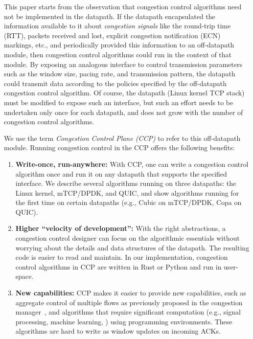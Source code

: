 This paper starts from the observation that congestion control algorithms need not be implemented in the datapath. 
If the datapath encapsulated the information available to it about {\em congestion signals} like the round-trip time (RTT), packets received and lost, explicit congestion notification (ECN) markings, etc., and periodically provided this information to an off-datapath module, then congestion control algorithms could run in the context of that module. 
By exposing an analogous interface to control transmission parameters such as the window size, pacing rate, and transmission pattern, the datapath could transmit data according to the policies specified by the off-datapath congestion control algorithm. Of course, the datapath (\eg Linux kernel TCP stack) must be modified to expose
such an interface, but such an effort needs to be undertaken only once for each datapath, and does not grow with the number of congestion control algorithms.

We use the term {\em Congestion Control Plane (CCP)} to refer to this off-datapath module. Running congestion control in the CCP offers the following benefits:
\begin{enumerate}
    \item {\bf Write-once, run-anywhere:} With CCP, one can write a congestion control algorithm once and run it on any datapath that supports the specified interface. 
    We describe several algorithms running on three datapaths: the Linux kernel, mTCP/DPDK, and QUIC, and show algorithms running for the first time on certain datapaths (e.g., Cubic on mTCP/DPDK, Copa on QUIC).
    \item {\bf Higher ``velocity of development'':} With the right abstractions,
      a congestion control designer can focus on the algorithmic essentials
      without worrying about the details and data structures of the
      datapath. The resulting code is easier to read and maintain. In our implementation, congestion control algorithms in CCP are written in Rust or Python and run in user-space. 

    \item {\bf New capabilities:} CCP makes it easier to provide new
      capabilities, such as aggregate control of multiple flows as previously
      proposed in the congestion manager~\cite{cm}, and algorithms that require significant computation (e.g., signal processing, machine learning, \etc) using \userspace programming environments. These algorithms are hard to write as window updates on incoming ACKs.
\end{enumerate}

